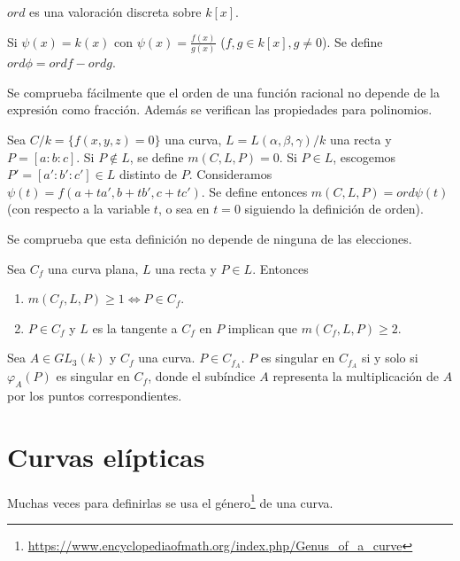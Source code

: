 \documentclass[CR.tex]{subfiles}
\begin{document}
\begin{nota}
$ord$ es una valoración discreta sobre $k[x]$. 
\end{nota}

\begin{defi}
Si $\psi(x)=k(x)$ con $\psi(x)=\frac{f(x)}{g(x)}$ ($f,g\in k[x], g\neq 0$). Se define $ord\phi=ord f-ord g$.
\end{defi}
Se comprueba fácilmente que el orden de una función racional no depende de la expresión como fracción. Además se verifican las propiedades para polinomios.

\begin{defi}
Sea $C/k=\{f(x,y,z)=0\}$ una curva, $L=L(\alpha,\beta,\gamma)/k$ una recta y $P=[a:b:c]$. Si $P\notin L$, se define $m(C,L,P)=0$. Si $P\in L$, escogemos $P'=[a':b':c']\in L$ distinto de $P$. Consideramos $\psi(t)=f(a+ta',b+tb',c+tc')$. Se define entonces $m(C,L,P)=ord\psi(t)$ (con respecto a la variable $t$, o sea en $t=0$ siguiendo la definición de orden). 
\end{defi}

Se comprueba que esta definición no depende de ninguna de las elecciones.

\begin{lemma}
Sea $C_f$ una curva plana, $L$ una recta y $P\in L$. Entonces 
\begin{enumerate}
\item $m(C_f,L,P)\geq 1\Leftrightarrow P\in C_f$. 
\item $P\in C_f$ y $L$ es la tangente a $C_f$ en $P$ implican que $m(C_f,L,P)\geq 2$.
\end{enumerate}
\end{lemma}

\begin{lemma}
Sea $A\in GL_3(k)$ y $C_f$ una curva. $P\in C_{f_A}$. $P$ es singular en $C_{f_A}$ si y solo si $\varphi_A(P)$ es singular en $C_f$, donde el subíndice $A$ representa la multiplicación de $A$ por los puntos correspondientes.   
\end{lemma}



\section{Curvas elípticas}

Muchas veces para definirlas se usa el género\footnote{\url{https://www.encyclopediaofmath.org/index.php/Genus_of_a_curve}} de una curva. 
\end{document}
